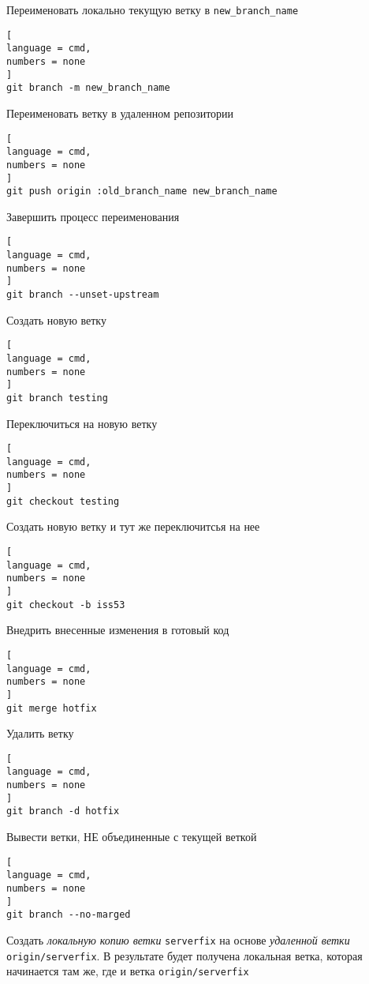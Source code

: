 \documentclass[%
	11pt,
	a4paper,
	utf8,
		]{article}
\begin{document}
Переименовать локально текущую ветку в \texttt{new\_branch\_name}
\begin{lstlisting}[
language = cmd,
numbers = none
]
git branch -m new_branch_name
\end{lstlisting}

Переименовать ветку в удаленном репозитории
\begin{lstlisting}[
language = cmd,
numbers = none
]
git push origin :old_branch_name new_branch_name
\end{lstlisting}

Завершить процесс переименования
\begin{lstlisting}[
language = cmd,
numbers = none
]
git branch --unset-upstream
\end{lstlisting}


Создать новую ветку

\begin{lstlisting}[
language = cmd,
numbers = none
]
git branch testing
\end{lstlisting}

Переключиться на новую ветку

\begin{lstlisting}[
language = cmd,
numbers = none
]
git checkout testing
\end{lstlisting}

Создать новую ветку и тут же переключитсья на нее

\begin{lstlisting}[
language = cmd,
numbers = none
]
git checkout -b iss53
\end{lstlisting}


Внедрить внесенные изменения в готовый код

\begin{lstlisting}[
language = cmd,
numbers = none
]
git merge hotfix
\end{lstlisting}

Удалить ветку 

\begin{lstlisting}[
language = cmd,
numbers = none
]
git branch -d hotfix
\end{lstlisting}

Вывести ветки, НЕ объединенные с текущей веткой

\begin{lstlisting}[
language = cmd,
numbers = none
]
git branch --no-marged
\end{lstlisting}


Создать \emph{локальную копию ветки} \texttt{serverfix} на основе \emph{удаленной ветки} \texttt{origin/serverfix}. В результате будет получена локальная ветка, которая начинается там же, где и ветка \texttt{origin/serverfix}
\end{document}
